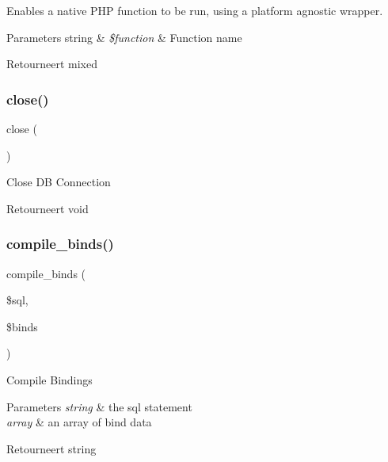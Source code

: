 Enables a native P\+HP function to be run, using a platform agnostic wrapper.


\begin{DoxyParams}[1]{Parameters}
string & {\em \$function} & Function name \\
\hline
\end{DoxyParams}
\begin{DoxyReturn}{Retourneert}
mixed 
\end{DoxyReturn}
\mbox{\label{class_c_i___d_b__driver_aa69c8bf1f1dcf4e72552efff1fe3e87e}} 
\subsubsection{\texorpdfstring{close()}{close()}}
{\footnotesize\ttfamily close (\begin{DoxyParamCaption}{ }\end{DoxyParamCaption})}

Close DB Connection

\begin{DoxyReturn}{Retourneert}
void 
\end{DoxyReturn}
\mbox{\label{class_c_i___d_b__driver_a0ba381d2e9078472bd0167e75cc8033c}} 
\subsubsection{\texorpdfstring{compile\_binds()}{compile\_binds()}}
{\footnotesize\ttfamily compile\+\_\+binds (\begin{DoxyParamCaption}\item[{}]{\$sql,  }\item[{}]{\$binds }\end{DoxyParamCaption})}

Compile Bindings


\begin{DoxyParams}{Parameters}
{\em string} & the sql statement \\
\hline
{\em array} & an array of bind data \\
\hline
\end{DoxyParams}
\begin{DoxyReturn}{Retourneert}
string 
\end{DoxyReturn}
\mbox{\label{class_c_i___d_b__driver_a7f59c2dc2e3226fe49f35f8c49e8fc94}} 
